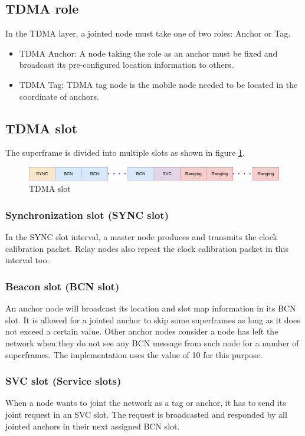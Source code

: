 \documentclass[\main/main.tex]{subfiles}
\begin{document}
\subsection{TDMA role}
In the TDMA layer, a jointed node must take one of two roles: Anchor or Tag.
\begin{itemize}
    \item TDMA Anchor: A node taking the role as an anchor must be fixed and broadcast its pre-configured location information to others.
    \item TDMA Tag: TDMA tag node is the mobile node needed to be located in the coordinate of anchors.
\end{itemize}

\subsection{TDMA slot}
The superframe is divided into multiple slots as shown in figure \ref{fig:tdma_slot}.
\begin{figure}[ht]
    \begin{center}
        \includegraphics[scale=0.4]{tdma_slot.png}
    \end{center}
    \caption{TDMA slot}
    \label{fig:tdma_slot}
\end{figure}

\subsubsection{Synchronization slot (SYNC slot)}
In the SYNC slot interval, a master node produces and transmits the clock calibration packet. Relay nodes also repeat the clock calibration packet in this interval too.
\subsubsection{Beacon slot (BCN slot)}
An anchor node will broadcast its location and slot map information in its BCN slot. It is allowed for a jointed anchor to skip some superframes as long as it does not exceed a certain value. Other anchor nodes consider a node has left the network when they do not see any BCN message from such node for a number of superframes. The implementation uses the value of 10 for this purpose.
\subsubsection{SVC slot (Service slots)}
When a node wants to joint the network as a tag or anchor, it has to send its joint request in an SVC slot. The request is broadcasted and responded by all jointed anchors in their next assigned BCN slot.
\end{document}
